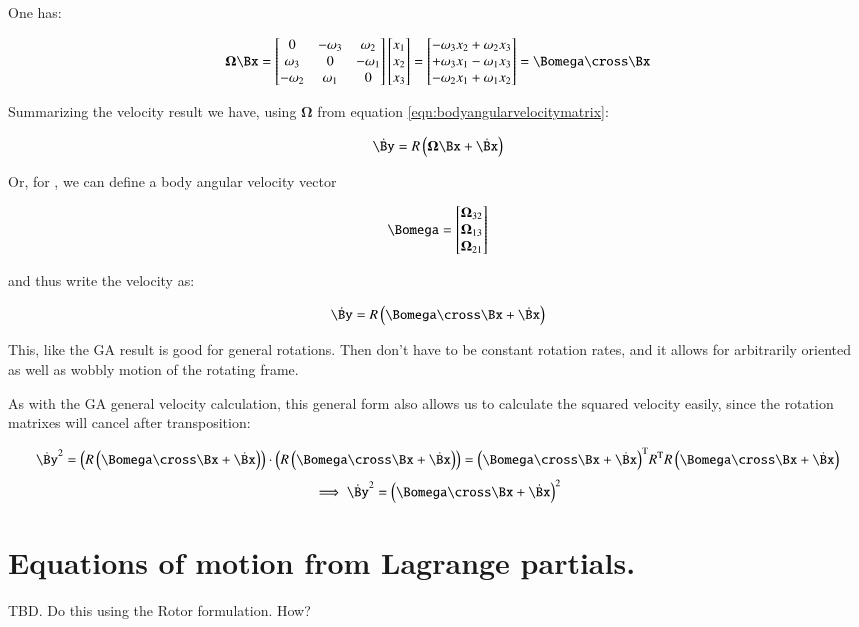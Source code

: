 \documentclass{article}      %
\newcommand{\dt}[1]{\dot{#1}}
\newcommand{\transpose}[1]{{#1}^{\text{T}}}
\newcommand{\BOmega}[0]{\boldsymbol{\Omega}}
\begin{document}
One has:

\[
\BOmega \Bx = 
\begin{bmatrix}
0 & -\omega_3 & \omega_2 \\
\omega_3 &  0 & -\omega_1 \\
-\omega_2 & \omega_1 &  0 \\
\end{bmatrix}
\begin{bmatrix}
x_1 \\
x_2 \\
x_3 \\
\end{bmatrix}
=
\begin{bmatrix}
-\omega_3 x_2 +\omega_2 x_3 \\
+\omega_3 x_1 -\omega_1 x_3 \\
-\omega_2 x_1 +\omega_1 x_2 \\
\end{bmatrix}
= \Bomega \cross \Bx
\]

Summarizing the velocity result we have, using $\BOmega$ from equation \ref{eqn:bodyangularvelocitymatrix}:

\begin{equation}
\dt{\By} = R \left( \BOmega \Bx + \dt{\Bx} \right)
\end{equation}

Or, for , we can define a body angular velocity vector

\begin{equation}
\Bomega = 
\begin{bmatrix}
\BOmega_{32} \\
\BOmega_{13} \\
\BOmega_{21} \\
\end{bmatrix}
\end{equation}

and thus write the velocity as:

\begin{equation}
\dt{\By} = R \left( \Bomega \cross \Bx + \dt{\Bx} \right)
\end{equation}

This, like the GA result is good for general rotations.  Then don't have to be constant
rotation rates, and it allows for arbitrarily
oriented as well as wobbly motion of the rotating frame.

As with the GA general velocity calculation, this general form also allows us to calculate
the squared velocity easily, since the rotation matrixes will
cancel after transposition:

\[
\dt{\By}^2 = 
\left(R \left( \Bomega \cross \Bx + \dt{\Bx} \right)\right) \cdot
\left(R \left( \Bomega \cross \Bx + \dt{\Bx} \right)\right)
=
\transpose{\left( \Bomega \cross \Bx + \dt{\Bx} \right)} \transpose{R}
R \left( \Bomega \cross \Bx + \dt{\Bx} \right)
\]
\[
\implies
\dt{\By}^2 = 
{\left( \Bomega \cross \Bx + \dt{\Bx} \right)}^2
\]

\section{ Equations of motion from Lagrange partials. }

TBD.  Do this using the Rotor formulation.  How?
\end{document}
